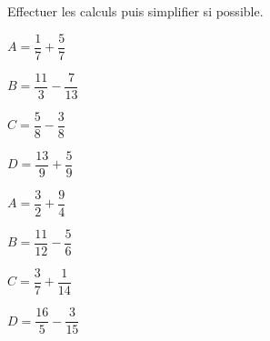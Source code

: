 \documentclass[a4paper]{book}
\begin{document}
    \begin{exercice}
        Effectuer les calculs puis simplifier si possible.
        
        \begin{minipage}{0.2\linewidth}
            $A=\dfrac{1}{7}+\dfrac{5}{7}$

            \vspace{2cm}
        \end{minipage}
        \hfill\vline\hfill
        \begin{minipage}{0.2\linewidth}
            $B=\dfrac{11}{3}-\dfrac{7}{13}$    

            \vspace{2cm}
        \end{minipage}
        \hfill\vline\hfill
        \begin{minipage}{0.2\linewidth}
            $C=\dfrac{5}{8}-\dfrac{3}{8}$

            \vspace{2cm}
        \end{minipage}
        \hfill\vline\hfill
        \begin{minipage}{0.2\linewidth}
            $D=\dfrac{13}{9}+\dfrac{5}{9}$

            \vspace{2cm}
        \end{minipage}

        

        \begin{minipage}{0.2\linewidth}
            $A=\dfrac{3}{2}+\dfrac{9}{4}$

            \vspace{2cm}
        \end{minipage}
        \hfill\vline\hfill
        \begin{minipage}{0.2\linewidth}
            $B=\dfrac{11}{12}-\dfrac{5}{6}$    

            \vspace{2cm}
        \end{minipage}
        \hfill\vline\hfill
        \begin{minipage}{0.2\linewidth}
            $C=\dfrac{3}{7}+\dfrac{1}{14}$

            \vspace{2cm}
        \end{minipage}
        \hfill\vline\hfill
        \begin{minipage}{0.2\linewidth}
            $D=\dfrac{16}{5}-\dfrac{3}{15}$

            \vspace{2cm}
        \end{minipage}
    \end{exercice}
\end{document}
